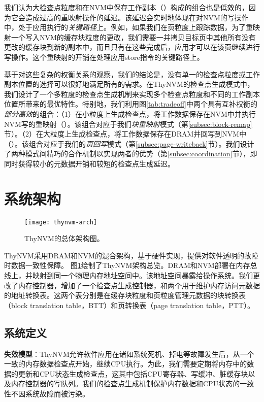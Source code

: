 我们认为大检查点粒度和在NVM中保存工作副本（）构成的组合也是低效的，因为它会造成过高的重映射操作的延迟。该延迟会实时地体现在对NVM的写操作中，处于应用执行的\emph{关键路径}上。例如，如果我们在页粒度上跟踪数据，为了重映射一个写入NVM的缓存块粒度的更改，我们需要一并拷贝目标页中其他所有没有更改的缓存块到新的副本中，而且只有在这些完成后，应用才可以在该页继续进行写操作。这个重映射的开销在处理应用store指令的关键路径上。

基于对这些复杂的权衡关系的观察，我们的结论是，没有单一的检查点粒度或工作副本位置的选择可以很好地满足所有的需求。在ThyNVM的检查点生成模式中，我们设计了一个多粒度的检查点生成机制来实现多个检查点粒度和不同的工作副本位置所带来的最优特性。特别地，我们利用图\ref{tab:tradeoff}中两个具有互补权衡的\emph{部分高效}的组合：（1）在小粒度上生成检查点，将工作数据保存在NVM中并执行NVM写的重映射（）。该组合对应于我们{\em 块重映射}模式（第\ref{subsec:block-remap}节）。（2）在大粒度上生成检查点，将工作数据保存在DRAM并回写到NVM中（）。该组合对应于我们的\emph{页回写}模式（第\ref{subsec:page-writeback}节）。我们设计了两种模式间精巧的合作机制以实现两者的优势（第\ref{subsec:coordination}节），即同时获得较小的元数据开销和较短的检查点生成延迟。

\section{系统架构}

\begin{figure}[!h]
\centering
\texttt{[image: thynvm-arch]}
\caption{ThyNVM的总体架构图。}
\label{fig:thynvm-arch}
\end{figure}

ThyNVM采用DRAM和NVM的混合架构，基于硬件实现，提供对软件透明的故障时数据一致性保障。
图\ref{fig:thynvm-arch}绘制了ThyNVM架构总览。DRAM和NVM部署在内存总线上，并映射到同一个物理内存地址空间中。该地址空间暴露给操作系统。我们更改了内存控制器，增加了一个检查点生成控制器，和两个用于维护内存访问元数据的地址转换表。这两个表分别是在缓存块粒度和页粒度管理元数据的块转换表（block translation table，BTT）和页转换表（page translation table，PTT）。

\subsection{系统定义}

\textbf{失效模型}：ThyNVM允许软件应用在诸如系统死机、掉电等故障发生后，从一个一致的内存数据检查点开始，继续CPU执行。为此，我们需要定期将内存中的数据的更新和CPU状态生成检查点，这其中包括CPU寄存器、写缓冲、脏缓存块以及内存控制器的写队列。我们的检查点生成机制保护内存数据和CPU状态的一致性不因系统故障而被污染。

